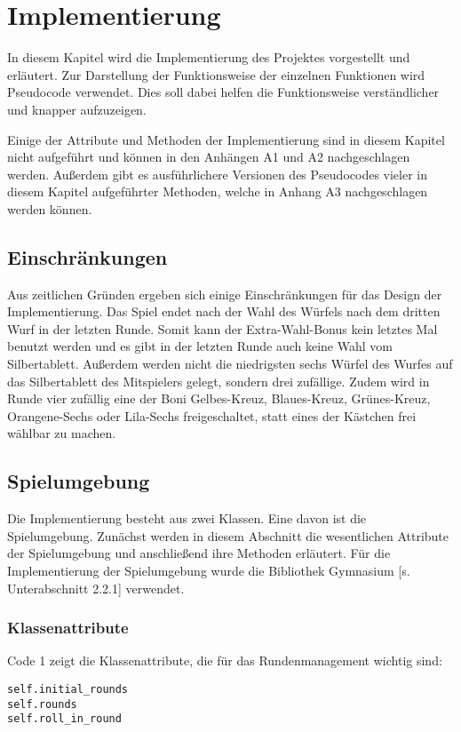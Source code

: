 \section{Implementierung}
In diesem Kapitel wird die Implementierung des Projektes vorgestellt und erläutert. Zur Darstellung der Funktionsweise der einzelnen Funktionen wird Pseudocode verwendet. Dies soll dabei helfen die Funktionsweise verständlicher und knapper aufzuzeigen.

Einige der Attribute und Methoden der Implementierung sind in diesem Kapitel nicht aufgeführt und können in den Anhängen A1 und A2 nachgeschlagen werden. Außerdem gibt es ausführlichere Versionen des Pseudocodes vieler in diesem Kapitel aufgeführter Methoden, welche in Anhang A3 nachgeschlagen werden können.
\subsection{Einschränkungen}
Aus zeitlichen Gründen ergeben sich einige Einschränkungen für das Design der Implementierung. Das Spiel endet nach der Wahl des Würfels nach dem dritten Wurf in der letzten Runde. Somit kann der Extra-Wahl-Bonus kein letztes Mal benutzt werden und es gibt in der letzten Runde auch keine Wahl vom Silbertablett. Außerdem werden nicht die niedrigsten sechs Würfel des Wurfes auf das Silbertablett des Mitspielers gelegt, sondern drei zufällige. Zudem wird in Runde vier zufällig eine der Boni Gelbes-Kreuz, Blaues-Kreuz, Grünes-Kreuz, Orangene-Sechs oder Lila-Sechs freigeschaltet, statt eines der Kästchen frei wählbar zu machen.
\subsection{Spielumgebung}
Die Implementierung besteht aus zwei Klassen. Eine davon ist die Spielumgebung. Zunächst werden in diesem Abschnitt die wesentlichen Attribute der Spielumgebung und anschließend ihre Methoden erläutert. Für die Implementierung der Spielumgebung wurde die Bibliothek Gymnasium [s. Unterabschnitt 2.2.1] verwendet.
\subsubsection{Klassenattribute}
\begin{minipage}{\linewidth}
Code 1 zeigt die Klassenattribute, die für das Rundenmanagement wichtig sind:
\vspace{0.5cm}
\begin{lstlisting}[caption={Klassenattribute für das Runden-System}, basicstyle=\ttfamily]
self.initial_rounds
self.rounds
self.roll_in_round
\end{lstlisting}
\end{minipage}

